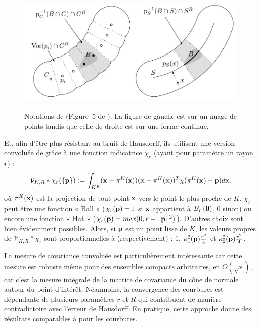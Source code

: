 \begin{figure}[ht]{
    \begin{center}
    \includegraphics[height=6cm]{images/Feature/VCM_notations}
    \end{center}}
    \caption[Notations de \VCM.]{Notations de \VCM (Figure~5 de \cite{Merigot2011}). La figure de gauche est sur un nuage de points tandis que celle de droite est sur une forme continue. \label{fig:VCM-multiscale-c}}
\end{figure}

Et, afin d'être plus résistant au bruit de Hausdorff, ils utilisent une
version convoluée de \VCM grâce à une fonction indicatrice $\chi_r$
(ayant pour paramètre un rayon $r$) :
%
\begin{equation}
  \mathcal{V}_{K,R} \ast \chi_r(\{\mathbf{p}\}) := \int_{K^R} (\mathbf{x} - \pi^K(\mathbf{x}))(\mathbf{x} - \pi^K(\mathbf{x}))^T \chi(\pi^K(\mathbf{x}) - \mathbf{p}) d\mathbf{x} .
\end{equation}
%
où $\pi^K(\mathbf{x})$ est la projection de tout point $\mathbf{x}$ vers le point le plus
proche de $K$. $\chi_r$ peut être une fonction « Ball » ($\chi_r(\mathbf{p}) = 1$ si
$\mathbf{x}$ appartient à $B_{r}\left(\mathbf{0}\right)$, $0$ sinon) ou encore une fonction «
Hat » ($\chi_r(\mathbf{p}) = max(0, r - ||\mathbf{p}||^2)$). D'autres choix sont bien
évidemment possibles.
%
Alors, si $\mathbf{p}$ est un point lisse de $K$, les valeurs propres de
$\mathcal{V}_{K,R} \ast \chi_r$ sont proportionnelles à (respectivement) : $1$,
$\kappa_{1}^2(\mathbf{p})\frac{r^2}{4}$ et $\kappa_{2}^2(\mathbf{p})\frac{r^2}{4}$.
%


%
La mesure de covariance convoluée est particulièrement intéressante car cette
mesure est robuste même pour des ensembles compacts arbitraires, en
$O(\sqrt{\epsilon})$, car c'est la mesure intégrale de la matrice
de covariance du cône de normale autour du point d'intérêt. Néanmoins, la
convergence des courbures est dépendante de plusieurs paramètres $r$ et $R$ qui
contribuent de manière contradictoire avec l'erreur de Hausdorff. En pratique,
cette approche donne des résultats comparables à \JetFitting pour les courbures.

